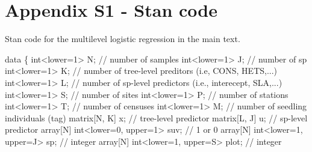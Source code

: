 \documentclass[
  12pt,
  letterpaper,
  DIV=11,
  numbers=noendperiod]{scrartcl}
\newenvironment{Shaded}{\begin{snugshade}}{\end{snugshade}}
\newcommand{\CommentTok}[1]{\textcolor[rgb]{0.37,0.37,0.37}{#1}}
\newcommand{\DataTypeTok}[1]{\textcolor[rgb]{0.68,0.00,0.00}{#1}}
\newcommand{\DecValTok}[1]{\textcolor[rgb]{0.68,0.00,0.00}{#1}}
\newcommand{\KeywordTok}[1]{\textcolor[rgb]{0.00,0.23,0.31}{#1}}
\newcommand{\NormalTok}[1]{\textcolor[rgb]{0.00,0.23,0.31}{#1}}
\begin{document}
\newpage

\hypertarget{appendix-s1---stan-code}{%
\section{Appendix S1 - Stan code}\label{appendix-s1---stan-code}}

Stan code for the multilevel logistic regression in the main text.

\begin{Shaded}
\begin{Highlighting}[]
\KeywordTok{data}\NormalTok{ \{}
  \DataTypeTok{int}\NormalTok{\textless{}}\KeywordTok{lower}\NormalTok{=}\DecValTok{1}\NormalTok{\textgreater{} N; }\CommentTok{// number of samples}
  \DataTypeTok{int}\NormalTok{\textless{}}\KeywordTok{lower}\NormalTok{=}\DecValTok{1}\NormalTok{\textgreater{} J; }\CommentTok{// number of sp}
  \DataTypeTok{int}\NormalTok{\textless{}}\KeywordTok{lower}\NormalTok{=}\DecValTok{1}\NormalTok{\textgreater{} K; }\CommentTok{// number of tree{-}level preditors (i.e, CONS, HETS,...)}
  \DataTypeTok{int}\NormalTok{\textless{}}\KeywordTok{lower}\NormalTok{=}\DecValTok{1}\NormalTok{\textgreater{} L; }\CommentTok{// number of sp{-}level predictors (i.e., interecept, SLA,...)}
  \DataTypeTok{int}\NormalTok{\textless{}}\KeywordTok{lower}\NormalTok{=}\DecValTok{1}\NormalTok{\textgreater{} S; }\CommentTok{// number of sites}
  \DataTypeTok{int}\NormalTok{\textless{}}\KeywordTok{lower}\NormalTok{=}\DecValTok{1}\NormalTok{\textgreater{} P; }\CommentTok{// number of stations}
  \DataTypeTok{int}\NormalTok{\textless{}}\KeywordTok{lower}\NormalTok{=}\DecValTok{1}\NormalTok{\textgreater{} T; }\CommentTok{// number of censuses}
  \DataTypeTok{int}\NormalTok{\textless{}}\KeywordTok{lower}\NormalTok{=}\DecValTok{1}\NormalTok{\textgreater{} M; }\CommentTok{// number of seedling individuals (tag)}
  \DataTypeTok{matrix}\NormalTok{[N, K] x; }\CommentTok{// tree{-}level predictor}
  \DataTypeTok{matrix}\NormalTok{[L, J] u; }\CommentTok{// sp{-}level predictor}
  \DataTypeTok{array}\NormalTok{[N] }\DataTypeTok{int}\NormalTok{\textless{}}\KeywordTok{lower}\NormalTok{=}\DecValTok{0}\NormalTok{, }\KeywordTok{upper}\NormalTok{=}\DecValTok{1}\NormalTok{\textgreater{} suv; }\CommentTok{// 1 or 0}
  \DataTypeTok{array}\NormalTok{[N] }\DataTypeTok{int}\NormalTok{\textless{}}\KeywordTok{lower}\NormalTok{=}\DecValTok{1}\NormalTok{, }\KeywordTok{upper}\NormalTok{=J\textgreater{} sp; }\CommentTok{// integer}
  \DataTypeTok{array}\NormalTok{[N] }\DataTypeTok{int}\NormalTok{\textless{}}\KeywordTok{lower}\NormalTok{=}\DecValTok{1}\NormalTok{, }\KeywordTok{upper}\NormalTok{=S\textgreater{} plot; }\CommentTok{// integer}

\end{Highlighting}
\end{Shaded}
\end{document}
